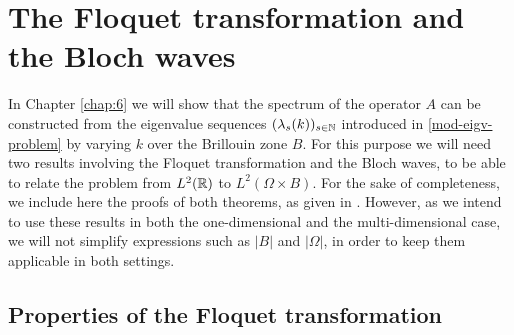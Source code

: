\chapter{The Floquet transformation and the Bloch waves} \label{chap:5}

In Chapter \ref{chap:6} we will show that the spectrum of the operator $A$ can be constructed from the eigenvalue sequences $(\lambda_{s}(k))_{s \in \mathbb{N}}$ introduced in \eqref{mod-eigv-problem} by varying $k$ over the Brillouin zone $B$. For this purpose we will need two results involving the Floquet transformation and the Bloch waves, to be able to relate the problem from $L^{2}(\mathbb{R})$ to $L^{2}(\Omega \times B)$. For the sake of completeness, we include here the proofs of both theorems, as given in \cite[Section 3.4, 3.5]{dorfler2011photonic}. However, as we intend to use these results in both the one-dimensional and the multi-dimensional case, we will not simplify expressions such as $|B|$ and $|\Omega|$, in order to keep them applicable in both settings.

\section{Properties of the Floquet transformation} \label{sec:5.1}

